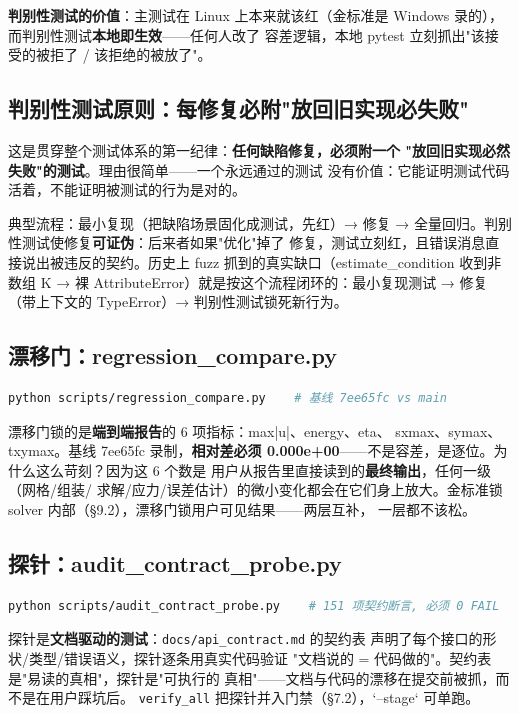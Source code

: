 \documentclass[12pt,a4paper]{ctexart}
\newcommand{\fem}{\Verb}
\begin{document}
\textbf{判别性测试的价值}：主测试在 Linux 上本来就该红（金标准是
Windows 录的），而判别性测试\textbf{本地即生效}——任何人改了
容差逻辑，本地 pytest 立刻抓出"该接受的被拒了 / 该拒绝的被放了"。

\subsection{判别性测试原则：每修复必附"放回旧实现必失败"}

这是贯穿整个测试体系的第一纪律：\textbf{任何缺陷修复，必须附一个
"放回旧实现必然失败"的测试}。理由很简单——一个永远通过的测试
没有价值：它能证明测试代码活着，不能证明被测试的行为是对的。

典型流程：最小复现（把缺陷场景固化成测试，先红）→ 修复 →
全量回归。判别性测试使修复\textbf{可证伪}：后来者如果"优化"掉了
修复，测试立刻红，且错误消息直接说出被违反的契约。历史上 fuzz
抓到的真实缺口（estimate\_condition 收到非数组 K → 裸
AttributeError）就是按这个流程闭环的：最小复现测试 →
修复（带上下文的 TypeError）→ 判别性测试锁死新行为。

\subsection{漂移门：regression\_compare.py}

\begin{lstlisting}[language=bash]
python scripts/regression_compare.py    # 基线 7ee65fc vs main
\end{lstlisting}

漂移门锁的是\textbf{端到端报告}的 6 项指标：max|u|、energy、eta、
sxmax、symax、txymax。基线 7ee65fc 录制，\textbf{相对差必须
0.000e+00}——不是容差，是逐位。为什么这么苛刻？因为这 6 个数是
用户从报告里直接读到的\textbf{最终输出}，任何一级（网格/组装/
求解/应力/误差估计）的微小变化都会在它们身上放大。金标准锁
solver 内部（§9.2），漂移门锁用户可见结果——两层互补，
一层都不该松。

\subsection{探针：audit\_contract\_probe.py}

\begin{lstlisting}[language=bash]
python scripts/audit_contract_probe.py    # 151 项契约断言, 必须 0 FAIL
\end{lstlisting}

探针是\textbf{文档驱动的测试}：\fem|docs/api_contract.md| 的契约表
声明了每个接口的形状/类型/错误语义，探针逐条用真实代码验证
"文档说的 = 代码做的"。契约表是"易读的真相"，探针是"可执行的
真相"——文档与代码的漂移在提交前被抓，而不是在用户踩坑后。
\fem|verify_all| 把探针并入门禁（§7.2），`--stage` 可单跑。
\end{document}
